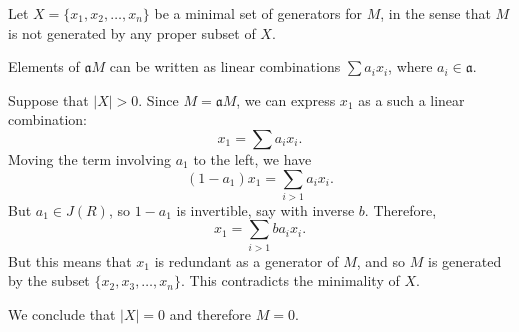 \documentclass[12pt]{article}
\begin{document}
Let $X = \{x_1, x_2, \dots, x_n\}$ be a minimal set of generators for $M$, in the sense that $M$ is not generated by any proper subset of $X$.

Elements of $\mathfrak{a}M$ can be written as linear combinations $\sum a_i x_i$, where $a_i \in \mathfrak{a}$.

Suppose that $|X| > 0$.  Since $M = \mathfrak{a}M$, we can express $x_1$ as a such a linear combination:
$$x_1 = \sum a_i x_i.$$
Moving the term involving $a_1$ to the left, we have
$$(1 - a_1)x_1 = \sum_{i > 1} a_i x_i.$$
But $a_1 \in J(R)$, so $1-a_1$ is invertible, say with inverse $b$.
Therefore,
$$x_1 = \sum_{i > 1} b a_i x_i.$$
But this means that $x_1$ is redundant as a generator of $M$, and so $M$ is generated by the subset $\{x_2, x_3, \dots, x_n\}$.  This contradicts the minimality of $X$.

We conclude that $|X| = 0$ and therefore $M = 0$.
\end{document}
